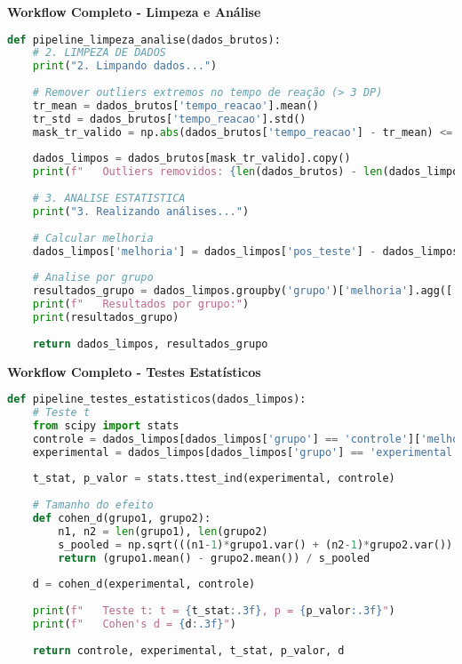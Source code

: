 \begin{examplebox}
\textbf{Workflow Completo - Limpeza e Análise}

\begin{lstlisting}[language=Python]
def pipeline_limpeza_analise(dados_brutos):
    # 2. LIMPEZA DE DADOS
    print("2. Limpando dados...")
    
    # Remover outliers extremos no tempo de reação (> 3 DP)
    tr_mean = dados_brutos['tempo_reacao'].mean()
    tr_std = dados_brutos['tempo_reacao'].std()
    mask_tr_valido = np.abs(dados_brutos['tempo_reacao'] - tr_mean) <= 3 * tr_std
    
    dados_limpos = dados_brutos[mask_tr_valido].copy()
    print(f"   Outliers removidos: {len(dados_brutos) - len(dados_limpos)}")
    
    # 3. ANALISE ESTATISTICA
    print("3. Realizando análises...")
    
    # Calcular melhoria
    dados_limpos['melhoria'] = dados_limpos['pos_teste'] - dados_limpos['pre_teste']
    
    # Analise por grupo
    resultados_grupo = dados_limpos.groupby('grupo')['melhoria'].agg(['count', 'mean', 'std'])
    print(f"   Resultados por grupo:")
    print(resultados_grupo)
    
    return dados_limpos, resultados_grupo
\end{lstlisting}
\end{examplebox}

\begin{examplebox}
\textbf{Workflow Completo - Testes Estatísticos}

\begin{lstlisting}[language=Python]
def pipeline_testes_estatisticos(dados_limpos):
    # Teste t
    from scipy import stats
    controle = dados_limpos[dados_limpos['grupo'] == 'controle']['melhoria']
    experimental = dados_limpos[dados_limpos['grupo'] == 'experimental']['melhoria']
    
    t_stat, p_valor = stats.ttest_ind(experimental, controle)
    
    # Tamanho do efeito
    def cohen_d(grupo1, grupo2):
        n1, n2 = len(grupo1), len(grupo2)
        s_pooled = np.sqrt(((n1-1)*grupo1.var() + (n2-1)*grupo2.var()) / (n1+n2-2))
        return (grupo1.mean() - grupo2.mean()) / s_pooled
    
    d = cohen_d(experimental, controle)
    
    print(f"   Teste t: t = {t_stat:.3f}, p = {p_valor:.3f}")
    print(f"   Cohen's d = {d:.3f}")
    
    return controle, experimental, t_stat, p_valor, d
\end{lstlisting}
\end{examplebox}

